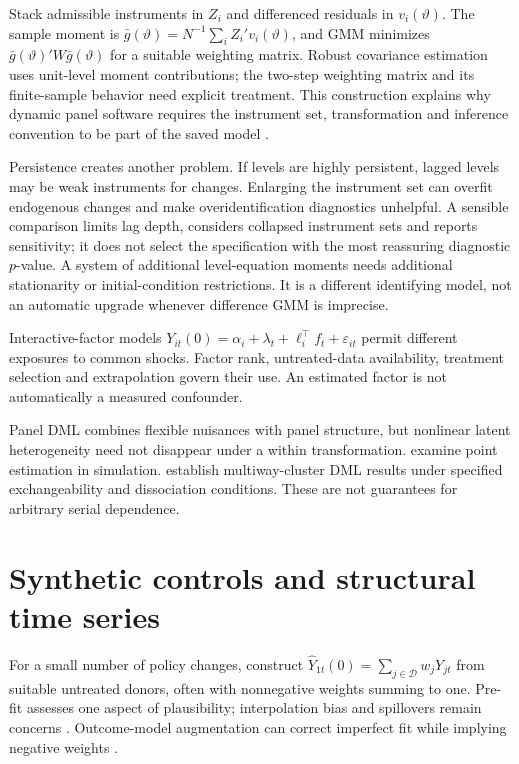 Stack admissible instruments in $Z_i$ and differenced residuals in
$v_i(\vartheta)$. The sample moment is
$\bar g(\vartheta)=N^{-1}\sum_i Z_i'v_i(\vartheta)$, and GMM
minimizes $\bar g(\vartheta)'W\bar g(\vartheta)$ for a suitable
weighting matrix. Robust covariance estimation uses unit-level moment
contributions; the two-step weighting matrix and its finite-sample
behavior need explicit treatment. This construction explains why dynamic
panel software requires the instrument set, transformation and inference
convention to be part of the saved model \citep{arellano1991}.

Persistence creates another problem. If levels are highly persistent,
lagged levels may be weak instruments for changes. Enlarging the instrument
set can overfit endogenous changes and make overidentification diagnostics
unhelpful. A sensible comparison limits lag depth, considers collapsed
instrument sets and reports sensitivity; it does not select the specification
with the most reassuring diagnostic $p$-value. A system of additional
level-equation moments needs additional stationarity or initial-condition
restrictions. It is a different identifying model, not an automatic
upgrade whenever difference GMM is imprecise.

Interactive-factor models
$Y_{it}(0)=\alpha_i+\lambda_t+\ell_i^\top f_t+\varepsilon_{it}$
permit different exposures to common shocks. Factor rank, untreated-data
availability, treatment selection and extrapolation govern their use.
An estimated factor is not automatically a measured confounder.

Panel DML combines flexible nuisances with panel structure, but nonlinear
latent heterogeneity need not disappear under a within transformation.
\citet{paneldml2024} examine point estimation in simulation.
\citet{cluster2021} establish multiway-cluster DML results under specified
exchangeability and dissociation conditions. These are not guarantees
for arbitrary serial dependence.

\section{Synthetic controls and structural time series}
For a small number of policy changes, construct
$\widehat Y_{1t}(0)=\sum_{j\in\mathcal D}w_jY_{jt}$ from suitable
untreated donors, often with nonnegative weights summing to one.
Pre-fit assesses one aspect of plausibility; interpolation bias and
spillovers remain concerns \citep{abadie2010,abadie2021}.
Outcome-model augmentation can correct imperfect fit while implying
negative weights \citep{benmichael2021}.


